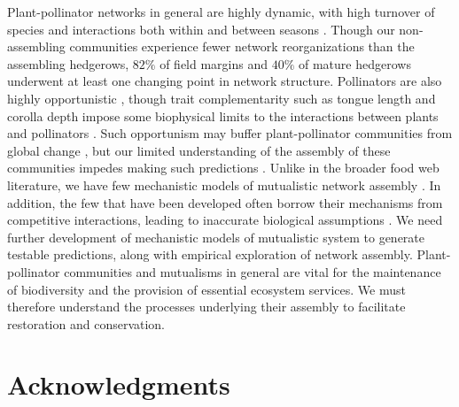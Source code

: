 \documentclass[12pt]{article}
\begin{document}
Plant-pollinator networks in general are highly dynamic, with high
turnover of species and interactions both within and between seasons
\citep{Burkle2011}. Though our non-assembling communities experience
fewer network reorganizations than the assembling hedgerows, $82\%$ of
field margins and $40\%$ of mature hedgerows underwent at least one
changing point in network structure. Pollinators are also highly
opportunistic \citep{petanidou-2008-564, Vazquez2005b,
  albrecht2010plant}, though trait complementarity such as tongue
length and corolla depth impose some biophysical limits to the
interactions between plants and pollinators
\citep{Vazquez2009evaluating, Vazquez2009, Stang2009, Stang2006,
  Santamaria2007}. Such opportunism may buffer plant-pollinator
communities from global change \citep[e.g.,][]{ramos2012topological,
  kaiser2010robustness}, but our limited understanding of the assembly
of these communities impedes making such predictions
\citep{Vazquez2009, Burkle2011}. Unlike in the broader food web
literature, we have few mechanistic models of mutualistic network
assembly \citep{valdovinos2013adaptive}. In addition, the few that
have been developed often borrow their mechanisms from competitive
interactions, leading to inaccurate biological assumptions
\citep{holland2006comment}. We need further development of mechanistic
models of mutualistic system to generate testable predictions, along
with empirical exploration of network assembly. Plant-pollinator
communities and mutualisms in general are vital for the maintenance of
biodiversity and the provision of essential ecosystem services. We
must therefore understand the processes underlying their assembly to
facilitate restoration and conservation.




\section*{Acknowledgments}
\label{sec:acknowledge}
\end{document}

